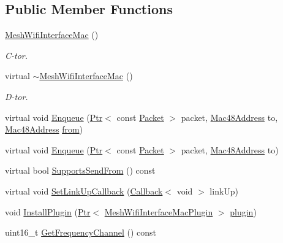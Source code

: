 \subsection*{Public Member Functions}
\begin{DoxyCompactItemize}
\item 
\hyperlink{classns3_1_1MeshWifiInterfaceMac_a0af11c7466d83a1b0832d0a353438dec}{Mesh\+Wifi\+Interface\+Mac} ()
\begin{DoxyCompactList}\small\item\em C-\/tor. \end{DoxyCompactList}\item 
virtual \hyperlink{classns3_1_1MeshWifiInterfaceMac_a71ebf7a33dd3a42c092dbbc267f4f098}{$\sim$\+Mesh\+Wifi\+Interface\+Mac} ()
\begin{DoxyCompactList}\small\item\em D-\/tor. \end{DoxyCompactList}\item 
virtual void \hyperlink{classns3_1_1MeshWifiInterfaceMac_a422554d3fcb60a5457db577d448cb608}{Enqueue} (\hyperlink{classns3_1_1Ptr}{Ptr}$<$ const \hyperlink{classns3_1_1Packet}{Packet} $>$ packet, \hyperlink{classns3_1_1Mac48Address}{Mac48\+Address} to, \hyperlink{classns3_1_1Mac48Address}{Mac48\+Address} \hyperlink{lte__amc_8m_a1b4c81ff74eb1a626b5ade44c81004b3}{from})
\item 
virtual void \hyperlink{classns3_1_1MeshWifiInterfaceMac_a5b558cface82e6e3fa1dfa00b10f0508}{Enqueue} (\hyperlink{classns3_1_1Ptr}{Ptr}$<$ const \hyperlink{classns3_1_1Packet}{Packet} $>$ packet, \hyperlink{classns3_1_1Mac48Address}{Mac48\+Address} to)
\item 
virtual bool \hyperlink{classns3_1_1MeshWifiInterfaceMac_aa13b68ceb2512774bda452dc8669bc14}{Supports\+Send\+From} () const 
\item 
virtual void \hyperlink{classns3_1_1MeshWifiInterfaceMac_a2d6262458556942c6c7491a5edcbddc2}{Set\+Link\+Up\+Callback} (\hyperlink{classns3_1_1Callback}{Callback}$<$ void $>$ link\+Up)
\item 
void \hyperlink{classns3_1_1MeshWifiInterfaceMac_a6902a348d5e717d2a7df28a93416dd9d}{Install\+Plugin} (\hyperlink{classns3_1_1Ptr}{Ptr}$<$ \hyperlink{classns3_1_1MeshWifiInterfaceMacPlugin}{Mesh\+Wifi\+Interface\+Mac\+Plugin} $>$ \hyperlink{visualizer-ideas_8txt_a82212ee380150b652f4dad598413d06f}{plugin})
\item 
uint16\+\_\+t \hyperlink{classns3_1_1MeshWifiInterfaceMac_a31723372889266979f21be8e82d784ca}{Get\+Frequency\+Channel} () const 

\end{DoxyCompactItemize}
